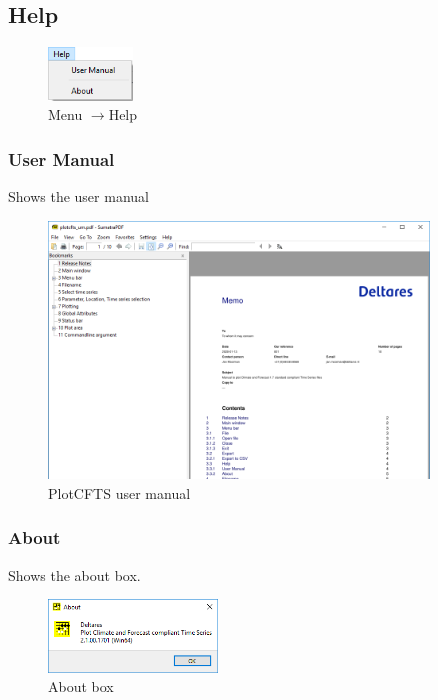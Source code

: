 \documentclass{deltares_memo}
\newcommand{\menuarrow}{$\rightarrow$}
\begin{document}
\subsection{Help}
\phantom{m}\vspace{-\baselineskip}
\begin{figure}[H]
    \centering    
    \includegraphics[width=0.2\textwidth]{pictures/menu_help.png}
    \caption{Menu \menuarrow Help}
\end{figure}

\subsubsection{User Manual}
Shows the user manual
\begin{figure}[H]
	\centering    
	\includegraphics[width=0.9\textwidth]{pictures/menu_help_user_manual.png}
	\caption{PlotCFTS user manual}
\end{figure}

\subsubsection{About}
Shows the about box.
\begin{figure}[H]
    \centering    
    \includegraphics[width=0.4\textwidth]{pictures/menu_help_about.png}
    \caption{About box}
\end{figure}
\end{document}
